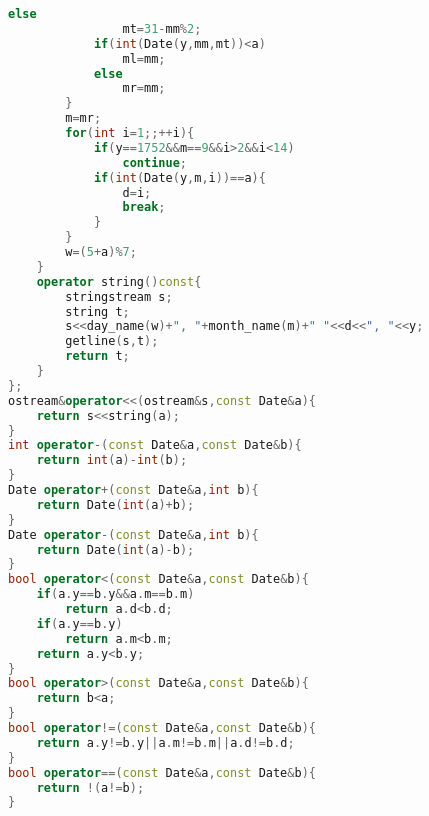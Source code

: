 \documentclass{book}
\begin{document}
\begin{lstlisting}[language=C++,title={Date.hpp (3596 bytes, 145 lines)}]
            else
                mt=31-mm%2;
            if(int(Date(y,mm,mt))<a)
                ml=mm;
            else
                mr=mm;
        }
        m=mr;
        for(int i=1;;++i){
            if(y==1752&&m==9&&i>2&&i<14)
                continue;
            if(int(Date(y,m,i))==a){
                d=i;
                break;
            }
        }
        w=(5+a)%7;
    }
    operator string()const{
        stringstream s;
        string t;
        s<<day_name(w)+", "+month_name(m)+" "<<d<<", "<<y;
        getline(s,t);
        return t;
    }
};
ostream&operator<<(ostream&s,const Date&a){
    return s<<string(a);
}
int operator-(const Date&a,const Date&b){
    return int(a)-int(b);
}
Date operator+(const Date&a,int b){
    return Date(int(a)+b);
}
Date operator-(const Date&a,int b){
    return Date(int(a)-b);
}
bool operator<(const Date&a,const Date&b){
    if(a.y==b.y&&a.m==b.m)
        return a.d<b.d;
    if(a.y==b.y)
        return a.m<b.m;
    return a.y<b.y;
}
bool operator>(const Date&a,const Date&b){
    return b<a;
}
bool operator!=(const Date&a,const Date&b){
    return a.y!=b.y||a.m!=b.m||a.d!=b.d;
}
bool operator==(const Date&a,const Date&b){
    return !(a!=b);
}
\end{lstlisting}
\end{document}
